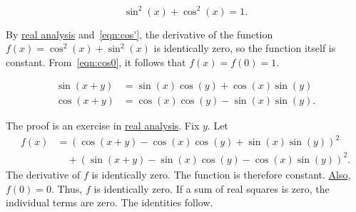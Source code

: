 \begin{lemma}[]
\label{lemma:circle} 
\begin{displaymath}
\sin^2(x) + \cos^2(x) = 1.
\end{displaymath}
\end{lemma}
%

\begin{proved}
  By \hyperref[back:analysis]{real analysis} and~\eqref{eqn:cos'}, the
  derivative of the function $f(x) = \cos^2(x) +\sin^2(x)$ is
  identically zero, so the function itself is constant.
  From~\eqref{eqn:cos0}, it follows that $f(x)=f(0)=1$.
  \swallowed\end{proved}



\begin{lemma}[]\label{lemma:sin-add}
\begin{align*}
\sin(x+y) &= \sin(x)\cos(y) + \cos(x)\sin(y)\\
\cos(x+y)  &= \cos(x)\cos(y) - \sin(x)\sin(y).
\end{align*}
\end{lemma}
%

\begin{proved}
The proof is an exercise in \hyperref[back:analysis]{real analysis}.
Fix $y$.  Let
\begin{align*}
f(x) &=(\cos(x+y) - \cos(x)\cos(y) +
\sin(x)\sin(y))^2 \\ 
  &\quad+ (\sin(x+y) -\sin(x)\cos(y) -\cos(x)\sin(y))^2.
\end{align*}
The derivative of $f$ is identically zero.  The function is therefore
constant.  \hyperref[eqn:cos0]{Also}, $f(0)=0$.  Thus, $f$ is
identically zero.  If a sum of real squares is zero, the individual
terms are zero. The identities follow.  \swallowed\end{proved}

